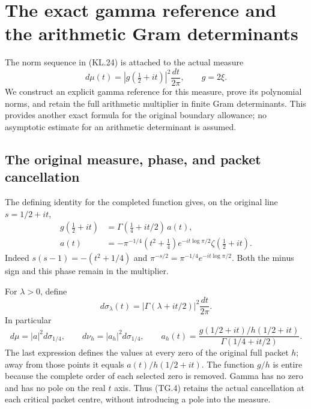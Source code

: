 \section{The exact gamma reference and the arithmetic Gram determinants}
\label{GraphV2:sec:theta-gamma-reference}

The norm sequence in (KL.24) is attached to the actual measure
\[
 d\mu(t)=|g(\tfrac12+it)|^2\frac{dt}{2\pi},\qquad g=2\xi.
                                                               \tag{TG.1}
\]
We construct an explicit gamma reference for this measure, prove its
polynomial norms, and retain the full arithmetic multiplier in finite
Gram determinants.  This provides another exact formula for the
original boundary allowance; no asymptotic estimate for an arithmetic
determinant is assumed.

\subsection{The original measure, phase, and packet cancellation}

The defining identity for the completed function gives, on the original
line \(s=1/2+it\),
\[
 \begin{aligned}
 g(\tfrac12+it)&=\Gamma(\tfrac14+it/2)\,a(t),\\
 a(t)&=-\pi^{-1/4}(t^2+\tfrac14)
           e^{-it\log\pi/2}\zeta(\tfrac12+it).
 \end{aligned}                                                   \tag{TG.2}
\]
Indeed \(s(s-1)=-(t^2+1/4)\) and
\(\pi^{-s/2}=\pi^{-1/4}e^{-it\log\pi/2}\).  Both the minus
sign and this phase remain in the multiplier.

For \(\lambda>0\), define
\[
 d\sigma_\lambda(t)=|\Gamma(\lambda+it/2)|^2\frac{dt}{2\pi}.
                                                               \tag{TG.3}
\]
In particular
\[
 d\mu=|a|^2d\sigma_{1/4},\qquad
 d\nu_h=|a_h|^2d\sigma_{1/4},\qquad
 a_h(t)=\frac{g(1/2+it)/h(1/2+it)}{\Gamma(1/4+it/2)}.
                                                               \tag{TG.4}
\]
The last expression defines the values at every zero of the original
full packet \(h\); away from those points it equals
\(a(t)/h(1/2+it)\).  The function \(g/h\) is entire because
the complete order of each selected zero is removed.  Gamma has no
zero and has no pole on the real \(t\) axis.  Thus (TG.4) retains
the actual cancellation at each critical packet centre, without
introducing a pole into the measure.

